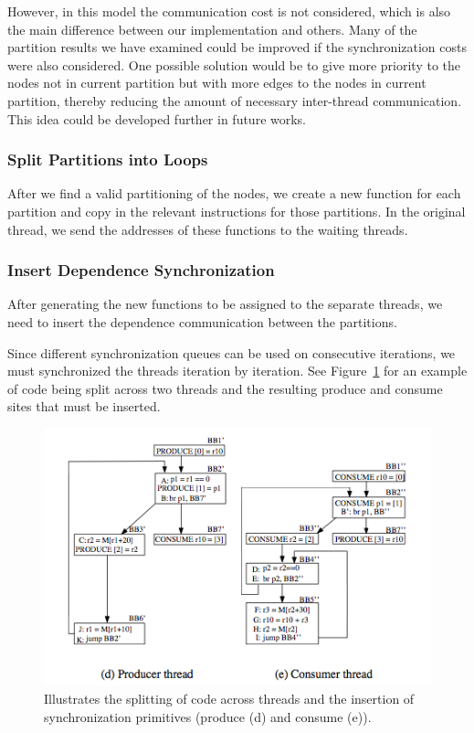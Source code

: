 \documentclass[11pt, letter]{article}
\begin{document}
However, in this model the communication cost is not considered, which is also the main difference between our implementation and others. Many of the partition results we have examined could be improved if the synchronization costs were also considered. One possible solution would be to give more priority to the nodes not in current partition but with more edges to the nodes in current partition, thereby reducing the amount of necessary inter-thread communication. This idea could be developed further in future works. 

\subsubsection{Split Partitions into Loops}
After we find a valid partitioning of the nodes, we create a new function for each partition and copy in the relevant instructions for those partitions.  In the original thread, we send the addresses of these functions to the waiting threads.

\subsubsection{Insert Dependence Synchronization}
After generating the new functions to be assigned to the separate threads, we need to insert the dependence communication between the partitions. 

 Since different synchronization queues can be used on consecutive iterations, we must synchronized the threads iteration by iteration. See Figure~\ref{sync} for an example of code being split across two threads and the resulting produce and consume sites that must be inserted.

\begin{figure}
\includegraphics[scale=0.75]{sync}
\caption{Illustrates the splitting of code across threads and the insertion of synchronization primitives (produce (d) and consume (e)).}
\label{sync}
\end{figure}
\end{document}
